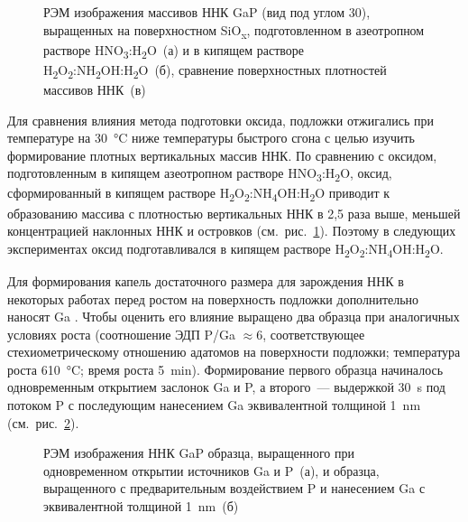 \begin{figure}[ht]  \caption{РЭМ изображения
массивов ННК GaP (вид под углом 30{\textdegree}), выращенных на поверхностном
SiO\textsubscript{x}, подготовленном в азеотропном растворе
HNO\textsubscript{3}:H\textsubscript{2}O~(а) и в кипящем растворе
H\textsubscript{2}O\textsubscript{2}:NH\textsubscript{2}OH:H\textsubscript{2}O~(б),
сравнение поверхностных плотностей массивов ННК~(в)}\label{fig:Image_39}
\end{figure}

Для сравнения влияния метода подготовки оксида, подложки отжигались при
температуре на 30~\si{\degreeCelsius} ниже температуры быстрого сгона с целью
изучить формирование плотных вертикальных массив ННК. По сравнению с оксидом,
подготовленным в кипящем азеотропном растворе
HNO\textsubscript{3}:H\textsubscript{2}O, оксид, сформированный в кипящем
растворе
H\textsubscript{2}O\textsubscript{2}:NH\textsubscript{4}OH:H\textsubscript{2}O
приводит к образованию массива с плотностью вертикальных ННК в 2,5 раза выше,
меньшей концентрацией наклонных ННК и островков (см.~рис.~\cref{fig:Image_39}).
Поэтому в следующих экспериментах оксид подготавливался в кипящем растворе
H\textsubscript{2}O\textsubscript{2}:NH\textsubscript{4}OH:H\textsubscript{2}O.

Для формирования капель достаточного размера для зарождения ННК в некоторых
работах перед ростом на поверхность подложки дополнительно наносят Ga
\cite{Plissard2010}. Чтобы оценить его влияние выращено два образца при
аналогичных условиях роста (соотношение ЭДП P/Ga \(\approx 6\), соответствующее
стехиометрическому отношению адатомов на поверхности подложки; температура
роста 610~\si{\degreeCelsius}; время роста 5~\si{\minute}). Формирование
первого образца начиналось одновременным открытием заслонок Ga и P, а
второго~--- выдержкой 30~\si{\second} под потоком P с последующим нанесением Ga
эквивалентной толщиной 1~\si{\nano\meter} (см.~рис.~\cref{fig:Image_40}).

\begin{figure}[ht]  \caption{РЭМ
	изображения ННК GaP образца, выращенного при одновременном открытии
источников Ga и P~(а), и образца, выращенного с предварительным воздействием P
и нанесением Ga с эквивалентной толщиной
1~{\si{\nano\metre}}~(б)}\label{fig:Image_40} \end{figure}

